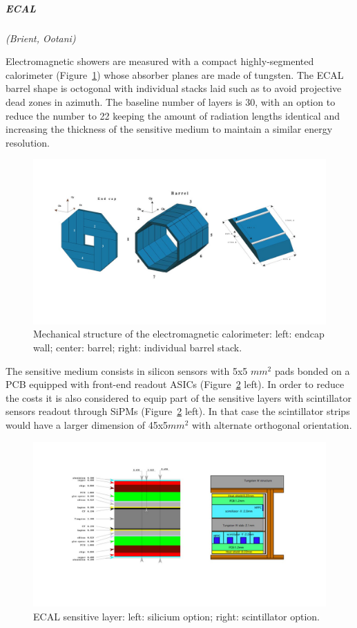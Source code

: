\vspace{1cm}
\subparagraph*{\bf ECAL}
\textit{(Brient, Ootani)}

Electromagnetic showers are measured with a compact highly-segmented calorimeter (Figure~\ref{fig:det:ECAL}) whose absorber planes are made of tungsten. The ECAL barrel shape is octogonal with individual stacks laid such as to avoid projective dead zones in azimuth. The baseline number of layers is 30, with an option to reduce the number to 22 keeping the amount of radiation lengths identical and increasing the thickness of the sensitive medium to maintain a similar energy resolution.

\begin{figure}[t!]
\centering
\includegraphics[width=1.2\hsize]{Detector/fig/ECAL_structure.jpg}
\caption{Mechanical structure of the electromagnetic calorimeter: left: endcap wall; center: barrel; right: individual barrel stack.}
\label{fig:det:ECAL}
\end{figure}

The sensitive medium consists in silicon sensors with 5x5 $mm^2$ pads bonded on a PCB equipped with front-end readout ASICs (Figure~\ref{fig:det:ECAL_readout} left). In order to reduce the costs it is also considered to equip part of the sensitive layers with scintillator sensors readout through SiPMs (Figure~\ref{fig:det:ECAL_readout} left). In that case the scintillator strips would have a larger dimension of 45x5$mm^2$ with alternate orthogonal orientation.  

\begin{figure}[t!]
\centering
\includegraphics[width=1.0\hsize]{Detector/fig/ECAL_readout.jpg}
\caption{ECAL sensitive layer: left: silicium option; right: scintillator option.}
\label{fig:det:ECAL_readout}
\end{figure}


